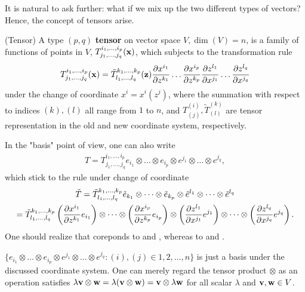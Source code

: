 It is natural to ask further: what if we mix up the two different types of vectors? Hence, the concept of tensors arise.

\begin{definition}
	(Tensor) A type $(p, q)$ \textbf{tensor} on vector space $V, \dim(V) = n$, is a family of functions of points in $V$, $T^{i_1, \dots, i_p}_{j_1, \dots, j_q}(\mathbf{x})$, which subjects to the transformation rule
	\begin{equation}
		T^{i_1, \dots, i_p}_{j_1, \dots, j_q}(\mathbf{x}) = \tilde{T}^{k_1, \dots, k_p}_{l_1, \dots, l_q}(\mathbf{z}) \frac{ \partial x^{i_1}}{ \partial z^{k_1} } \dots \frac{ \partial x^{i_p}}{ \partial z^{k_p} } \frac{ \partial z^{l_1}}{ \partial x^{j_1} } \dots \frac{ \partial z^{l_q}}{ \partial x^{j_q} }
		\label{eq:tensor_change_coef}
	\end{equation}
	under the change of coordinate $x^i = x^i(z^j)$, where the summation with respect to indices $(k), (l)$ all range from $1$ to $n$, and $T^{(i)}_{(j)}, \tilde{T}^{(k)}_{(l)}$ are tensor representation in the old and new coordinate system, respectively.

		In the "basis" point of view, one can also write
	\begin{eqnarray}
		T = T^{i_1, \dots, i_p}_{j_1, \dots, j_q} e_{i_1} \otimes \dots \otimes e_{i_p} \otimes e^{j_1} \otimes \dots \otimes e^{j_q},
	\end{eqnarray}
	which stick to the rule under change of coordinate
	\begin{multline}
		\tilde{T} = \tilde{T}^{k_1, \dots, k_p}_{l_1, \dots, l_q} \tilde{e}_{k_1} \otimes \dots \otimes \tilde{e}_{k_p} \otimes \tilde{e}^{l_1} \otimes \dots \otimes \tilde{e}^{l_q}\\
		= \tilde{T}^{k_1, \dots, k_p}_{l_1, \dots, l_q} \left( \frac{ \partial x^{i_1}}{ \partial z^{k_1} }e_{i_1} \right) \otimes \dots \otimes \left( \frac{ \partial x^{i_p}}{ \partial z^{k_p} }e_{i_p} \right) \otimes \left( \frac{ \partial z^{l_1}}{ \partial x^{j_1} }e^{j_1} \right) \otimes \dots \otimes \left( \frac{ \partial z^{l_q}}{ \partial x^{j_q} }e^{j_q} \right).
		\label{eq:tensor_change_basis}
	\end{multline}
	One should realize that  coreponds to  and , whereas  to  and .
\end{definition}

\begin{remark}
	$\{ e_{i_1} \otimes \dots \otimes e_{i_p} \otimes e^{j_1} \otimes \dots \otimes e^{j_q}: (i), (j) \in {1, 2, \dots, n} \}$ is just a basis under the discussed coordinate system. One can merely regard the tensor product $\otimes$ as an operation satisfies $\lambda \mathbf{v} \otimes \mathbf{w} = \lambda (\mathbf{v} \otimes \mathbf{w}) = \mathbf{v} \otimes \lambda\mathbf{w}$ for all scalar $\lambda$ and $\mathbf{v}, \mathbf{w} \in V$.
\end{remark}

